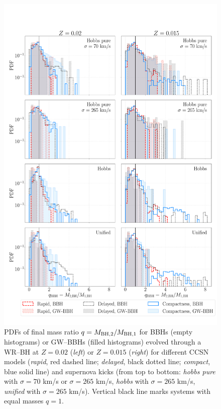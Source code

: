 \documentclass[a4paper,titlepage]{book}     	%
\begin{document}
\begin{appendices}
\begin{figure}
	\centering
	\includegraphics[width=\textwidth]{./images/remq.pdf}	
	\caption{PDFs of final mass ratio $q = M_{\rm BH,2}/M_{\rm BH,1}$ for BBHs (empty histograms) or GW--BBHs (filled histograms) evolved through a WR--BH at $Z=0.02$ (\emph{left}) or $Z=0.015$ (\emph{right}) for different CCSN models (\emph{rapid}, red dashed line; \emph{delayed}, black dotted line; \emph{compact}, blue solid line) and supernova kicks (from top to bottom: \emph{hobbs pure} with $\sigma = 70$ km/s or $\sigma = 265$ km/s, \emph{hobbs} with $\sigma = 265$ km/s, \emph{unified} with $\sigma = 265$ km/s). Vertical black line marks systems with equal masses $q=1$.}\label{fig:resultsqrem}
\end{figure}


\end{appendices}
\end{document}
